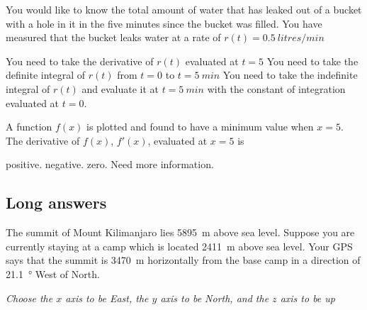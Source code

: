 \question You would like to know the total amount of water that has leaked out of a bucket with a hole in it in  the five minutes since the bucket was filled. You have measured that the bucket leaks water at a rate of $r(t)=\SI{0.5}{litres/min}$
\begin{checkboxes}
\choice You need to take the derivative of $r(t)$ evaluated at $t=5$
\CorrectChoice  You need to take the definite integral of $r(t)$ from $t=0$ to $t=\SI{5}{min}$
\choice You need to take the indefinite integral of $r(t)$ and evaluate it at $t=\SI{5}{min}$ with the constant of integration evaluated at $t=0$.
\end{checkboxes}

\question A function $f(x)$ is plotted and found to have a minimum value when $x=5$. The derivative of $f(x)$, $f'(x)$, evaluated at $x=5$ is
\begin{checkboxes}
\choice positive.
\choice negative.
\CorrectChoice zero.
\choice Need more information.
\end{checkboxes}

%
%
\subsection{Long answers}
\question The summit of Mount Kilimanjaro lies \SI{5895}{m} above sea level. Suppose you are currently staying at a camp which is located \SI{2411}{m} above sea level. Your GPS says that the summit is \SI{3470}{m} horizontally from the base camp in a direction of \SI{21.1}{\degree} West of North.
\textit{Choose the $x$ axis to be East, the $y$ axis to be North, and the $z$ axis to be up}

